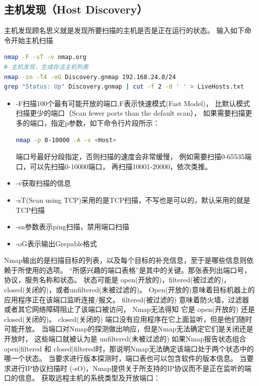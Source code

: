 \documentclass[letter]{book}
\begin{document}
\subsection{主机发现（Host Discovery）}

主机发现顾名思义就是发现所要扫描的主机是否是正在运行的状态。
输入如下命令开始主机扫描

\begin{lstlisting}[language=Bash]
nmap -F -sT -v nmap.org
# 主机发现，生成存活主机列表
nmap -sn -T4 -oG Discovery.gnmap 192.168.24.0/24
grep "Status: Up" Discovery.gnmap | cut -f 2 -d ' ' > LiveHosts.txt
\end{lstlisting}

\begin{itemize}
	\item{-F}扫描100个最有可能开放的端口,F表示快速模式(Fast Model)，
	比默认模式扫描更少的端口（Scan fewer ports than the default scan），
	如果需要扫描更多的端口，指定p参数，如下命令行片段所示：
	
	\begin{lstlisting}[language=Bash]
	nmap -p 0-10000 -A -v <Host>
	\end{lstlisting}
	
	端口号最好分段指定，否则扫描的速度会非常缓慢，
	例如需要扫描0-65535端口，可以先扫描0-10000端口，
	再扫描10001-20000，依次类推。
	
	\item{-v}获取扫描的信息
	\item{-sT(Scan using TCP)}采用的是TCP扫描，不写也是可以的，默认采用的就是TCP扫描
	\item{-sn参数表示ping扫描，禁用端口扫描}
	\item{-oG表示输出Grepable格式}
\end{itemize}

Nmap输出的是扫描目标的列表，以及每个目标的补充信息，至于是哪些信息则依赖于所使用的选项。
“所感兴趣的端口表格”是其中的关键。那张表列出端口号，协议，服务名称和状态。
状态可能是 open(开放的)，filtered(被过滤的)， closed(关闭的)，或者unfiltered(未被过滤的)。
Open(开放的)意味着目标机器上的应用程序正在该端口监听连接/报文。 
filtered(被过滤的) 意味着防火墙，过滤器或者其它网络障碍阻止了该端口被访问，
Nmap无法得知 它是 open(开放的) 还是 closed(关闭的)。 
closed(关闭的) 端口没有应用程序在它上面监听，但是他们随时可能开放。 
当端口对Nmap的探测做出响应，但是Nmap无法确定它们是关闭还是开放时，
这些端口就被认为是 unfiltered(未被过滤的) 如果Nmap报告状态组合 
open|filtered 和 closed|filtered时，那说明Nmap无法确定该端口处于两个状态中的哪一个状态。
当要求进行版本探测时，端口表也可以包含软件的版本信息。
当要求进行IP协议扫描时 (-sO)，Nmap提供关于所支持的IP协议而不是正在监听的端口的信息。
获取远程主机的系统类型及开放端口：
\end{document}
